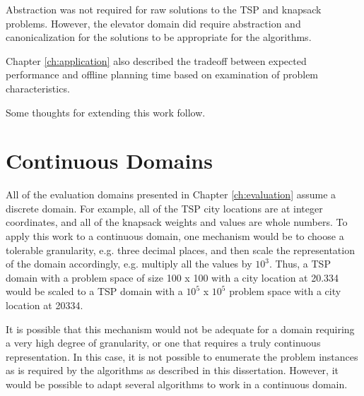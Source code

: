 Abstraction was not required for raw solutions to the TSP and knapsack problems.  However, the elevator domain did require abstraction and canonicalization for the solutions to be appropriate for the algorithms.

Chapter \ref{ch:application} also described the tradeoff between expected performance and offline planning time based on examination of problem characteristics.


Some thoughts for extending this work follow.

\section{Continuous Domains}
\label{sec:continuous-domains}
All of the evaluation domains presented in Chapter \ref{ch:evaluation} assume a discrete domain.  For example, all of the TSP city locations are at integer coordinates, and all of the knapsack weights and values are whole numbers.  To apply this work to a continuous domain, one mechanism would be to choose a tolerable granularity, e.g. three decimal places, and then scale the representation of the domain accordingly, e.g. multiply all the values by $10^3$.  Thus, a TSP domain with a problem space of size 100 x 100 with a city location at 20.334 would be scaled to a TSP domain with a $10^5$ x $10^5$ problem space with a city location at 20334.

It is possible that this mechanism would not be adequate for a domain requiring a very high degree of granularity, or one that requires a truly continuous representation.  In this case, it is not  possible to enumerate the problem instances as is required by the algorithms as described in this dissertation.  However, it would be possible to adapt several algorithms to work in a continuous domain.

